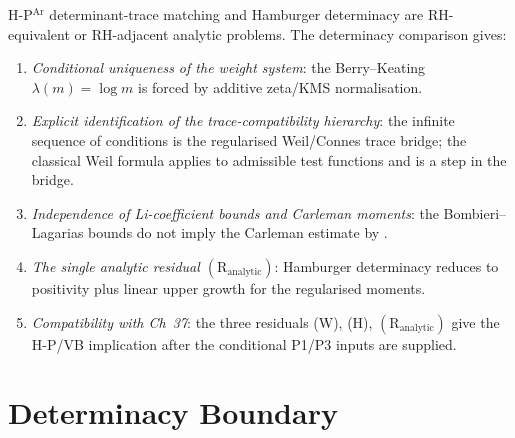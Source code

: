 \begin{remark}
\label{v4-arith:hpar-det:rem:wave3-contribution}
H-P\(^{\mathrm{Ar}}\) determinant-trace matching and Hamburger determinacy
are RH-equivalent or RH-adjacent analytic problems. The determinacy
comparison gives:
\begin{enumerate}
\item \emph{Conditional uniqueness of the weight system}:
the Berry--Keating \(\lambda(m)=\log m\) is forced by additive
zeta/KMS normalisation.
\item \emph{Explicit identification of the trace-compatibility
hierarchy}: the infinite sequence of conditions is the regularised
Weil/Connes trace bridge; the classical Weil formula applies
to admissible test functions and is a step in the bridge.
\item \emph{Independence of Li-coefficient bounds and Carleman
moments}: the Bombieri--Lagarias bounds do not imply the Carleman
estimate by .
\item \emph{The single analytic residual
\((\mathrm{R}_{\mathrm{analytic}})\)}: Hamburger determinacy reduces
to positivity plus linear upper growth for the regularised moments.
\item \emph{Compatibility with Ch~37}: the three residuals (W), (H),
\((\mathrm{R}_{\mathrm{analytic}})\) give the H-P/VB implication after
the conditional P1/P3 inputs are supplied.
\end{enumerate}
\end{remark}

\section{Determinacy Boundary}
\label{v4-arith:hpar-det:summary}

